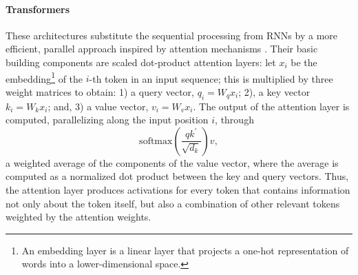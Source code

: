 


\paragraph{Transformers} These architectures substitute the sequential processing from RNNs by a more efficient, parallel approach inspired by 
attention mechanisms \parencite{vaswani2017attention,bahdanau2014neural}. Their basic building components are scaled dot-product attention layers:
let $x_i$ be the embedding\footnote{An embedding layer is a linear layer that projects a one-hot representation of words into a lower-dimensional space.} of the $i$-th token in an input sequence;
this is multiplied by three weight matrices to obtain: 1) a query vector, $q_i = W_q x_i$; 2), 
 a key vector $k_i = W_k x_i$;
 and, 3) a value vector, $v_i = W_v x_i$. The output of the attention layer is computed, parallelizing along the input position $i$, 
 through 
$$
\mbox{softmax}\left(\frac{q k^{'}}{\sqrt{d_k}}\right) v,
$$
 a weighted average of the components of the value vector, where the average is 
computed as a normalized dot product between the key and query vectors. Thus, the attention layer produces activations for every token  that contains information not only about the token itself, but also a combination of other relevant tokens weighted by the attention weights.

